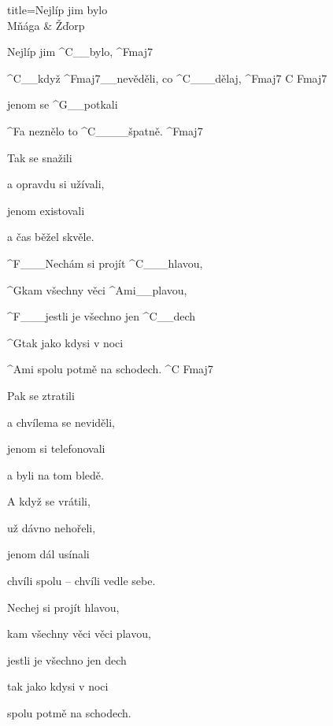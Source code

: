 \begin{song}{title=\predtitle\centering Nejlíp jim bylo \\\large Mňága \& Žďorp  \vspace*{-0.3cm}}  %
\begin{centerjustified}


\sloka 
	Nejlíp jim ^{C{\color{white}\_\_}}bylo, ^{Fmaj7}
	
	^{C{\color{white}\_\_}}když ^{Fmaj7{\color{white}\_\_}}nevěděli, co ^{C{\color{white}\_\_\_}}dělaj, ^{Fmaj7\,\,C\,\,Fmaj7}
	
	jenom se ^{G{\color{white}\_\_}}potkali 

	^{F}a neznělo to ^{C{\color{white}\_\_\_\_}}špatně. ^{Fmaj7} 

\sloka
	Tak se snažili 
	
	a opravdu si užívali,
	
	jenom existovali 
	
	a čas běžel skvěle.

	^{F{\color{white}\_\_\_}}Nechám si projít ^{C{\color{white}\_\_\_}}hlavou,
	
	^{G}kam všechny věci ^{Ami{\color{white}\_\_}}plavou,
	
	^{F{\color{white}\_\_\_}}jestli je všechno jen ^{C{\color{white}\_\_}}dech

	^{G}tak jako kdysi v noci 

	^{Ami\,\,}spolu potmě na schodech. ^{C\,\,Fmaj7}

\sloka
	Pak se ztratili 

	a chvílema se neviděli,

	jenom si telefonovali 

	a byli na tom bledě.

\sloka
	A když se vrátili,
	
	už dávno nehořeli,

	jenom dál usínali

	chvíli spolu -- chvíli vedle sebe.


	Nechej si projít hlavou,
	
	kam všechny věci věci plavou,
	
	jestli je všechno jen dech
	
	tak jako kdysi v noci 

	spolu potmě na schodech.


\end{centerjustified}
\setcounter{Slokočet}{0}
\end{song}
